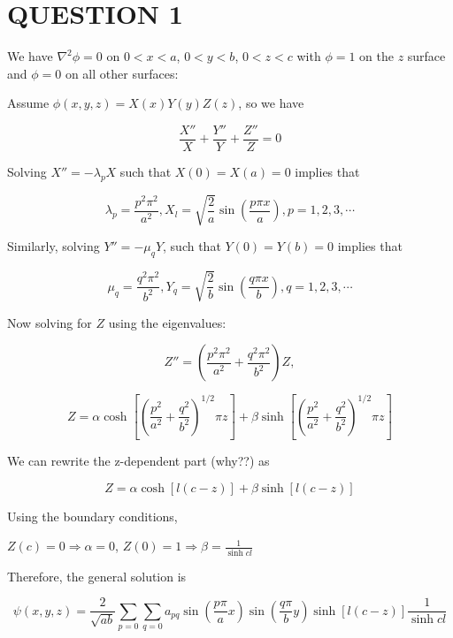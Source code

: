 \documentclass[a4paper]{article}
\begin{document}
	
\maketitle

\section{QUESTION 1}

We have $ \nabla^{2} \phi = 0 $ on $ 0 < x < a $, $ 0 < y < b $, $ 0 < z < c $ with $ \phi = 1 $ on the $ z $ surface and $ \phi = 0 $ on all other surfaces:

Assume $ \phi(x,y,z) = X(x) Y(y) Z(z) $, so we have

\[ \frac{X''}{X} + \frac{Y''}{Y} + \frac{Z''}{Z} = 0 \]

Solving $ X'' = - \lambda_{p} X $ such that $ X(0) = X(a) = 0 $ implies that

\[ \lambda_{p} = \frac{p^{2} \pi^{2}}{a^{2}}, X_{l} = \sqrt{\frac{2}{a}} \sin \left( \frac{p \pi x}{a} \right), p = 1,2,3,\cdots  \]

Similarly, solving $ Y'' = - \mu_{q} Y  $, such that $ Y(0) = Y(b) = 0 $ implies that

\[ \mu_{q} = \frac{q^{2} \pi^{2}}{b^{2}}, Y_{q} = \sqrt{\frac{2}{b}} \sin \left(  \frac{q \pi x}{b} \right), q = 1,2,3,\cdots  \]

Now solving for $ Z $ using the eigenvalues:

\[ Z'' = \left(   \frac{p^{2} \pi^{2}}{a^{2}}  + \frac{q^{2} \pi^{2}}{b^{2}} \right) Z, \]

\[ Z = \alpha \cosh \left[  \left(    \frac{p^{2}}{a^{2}} + \frac{q^{2}}{b^{2}} \right)^{1/2} \pi z  \right] + \beta \sinh \left[  \left(    \frac{p^{2}}{a^{2}} + \frac{q^{2}}{b^{2}} \right)^{1/2} \pi z  \right]  \]

We can rewrite the z-dependent part (why??) as


\[ Z = \alpha \cosh \left[ l(c-z)  \right] + \beta \sinh \left[ l(c-z)  \right]  \]

Using the boundary conditions, 

$ Z(c) = 0 \Rightarrow \alpha = 0 $, $ Z(0) = 1 \Rightarrow \beta= \frac{1}{\sinh cl}  $


Therefore, the general solution is 

\[ \psi(x,y,z) 
= \frac{2}{\sqrt{ab}} \sum_{p = 0} \sum_{q = 0} a_{pq} \sin \left(  \frac{p \pi}{a} x \right) \sin \left(  \frac{q \pi}{b} y \right)  \sinh \left[  l(c - z)\right] \frac{1}{\sinh cl}      \]
\end{document}
